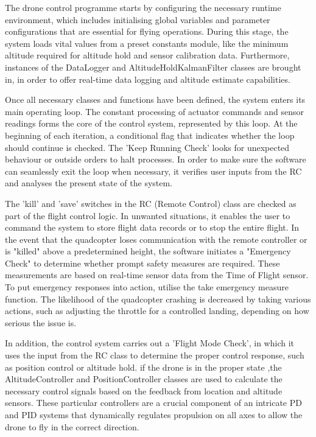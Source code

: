 \documentclass{report}
\begin{document}
The drone control programme starts by configuring the necessary runtime
environment, which includes initialising global variables and parameter
configurations that are essential for flying operations. During this stage, the
system loads vital values from a preset constants module, like the minimum
altitude required for altitude hold and sensor calibration data. Furthermore,
instances of the DataLogger and AltitudeHoldKalmanFilter classes are brought
in, in order to offer real-time data logging and altitude estimate
capabilities.

Once all necessary classes and functions have been defined, the system enters
its main operating loop. The constant processing of actuator commands and sensor
readings forms the core of the control system, represented by this loop. At the
beginning of each iteration, a conditional flag that indicates whether the loop
should continue is checked. The 'Keep Running Check' looks for unexpected
behaviour or outside orders to halt processes. In order to make sure the
software can seamlessly exit the loop when necessary, it verifies user inputs
from the RC and analyses the present state of the system.

The 'kill' and 'save' switches in the RC (Remote Control) class are checked as
part of the flight control logic. In unwanted situations, it enables the user to
command the system to store flight data records or to stop the entire flight. In
the event that the quadcopter loses communication with the remote controller or
is "killed" above a predetermined height, the software initiates a "Emergency
Check" to determine whether prompt safety measures are required. These
measurements are based on real-time sensor data from the Time of Flight sensor.
To put emergency responses into action, utilise the take emergency measure
function. The likelihood of the quadcopter crashing is decreased by taking
various actions, such as adjusting the throttle for a controlled landing,
depending on how serious the issue is.

In addition, the control system carries out a 'Flight Mode Check', in which it
uses the input from the RC class to determine the proper control response, such
as position control or altitude hold. if the drone is in the proper state ,the
AltitudeController and PositionController classes are used to calculate the
necessary control signals based on the feedback from location and altitude
sensors. These particular controllers are a crucial component of an intricate PD
and PID systems that dynamically regulates propulsion on all axes to allow the
drone to fly in the correct direction.
\end{document}
